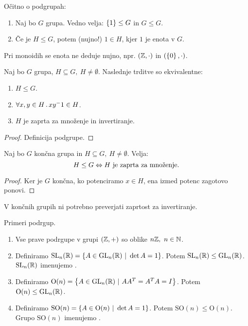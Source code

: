 \begin{opomba} 
    Očitno o podgrupah:
    \begin{enumerate}
        \item Naj bo $G$ grupa. Vedno velja: $\left\{1\right\} \leq G$ in $G \leq G$.
        \item Če je $H \leq G$, potem (nujno!) $1 \in H$, kjer $1$ je enota v $G$.
    \end{enumerate}
\end{opomba}

\begin{opomba}
    Pri monoidih se enota ne deduje nujno, npr. $(\mathbb{Z}, \cdot)$ in $(\left\{0\right\}, \cdot)$.
\end{opomba}

\begin{trditev}
    Naj bo $G$ grupa, $H \subseteq G, \ H \neq \emptyset$. Naslednje trditve so ekvivalentne:
    \begin{enumerate}
        \item $H \leq G$.
        \item $\forall x,y \in H \,.\, xy^-1 \in H$.
        \item $H$ je zaprta za množenje in invertiranje.
    \end{enumerate}
\end{trditev}

\begin{proof}
    Definicija podgrupe.
\end{proof}

\begin{posledica}
    Naj bo $G$ končna grupa in $H \subseteq G, \ H \neq \emptyset$. Velja: 
    $$H \leq G \Leftrightarrow H \text{ je zaprta za množenje}.$$
\end{posledica}

\begin{proof}
    Ker je $G$ končna, ko potenciramo $x \in H$, ena izmed potenc zagotovo ponovi.
\end{proof}

\begin{opomba}
    V končnih grupih ni potrebno preverjati zaprtost za invertiranje.
\end{opomba}

\begin{primer}
    Primeri podrgup.
    \begin{enumerate}
        \item Vse prave podrgupe v grupi $(\mathbb{Z}, +)$ so oblike $n\mathbb{Z}, \ n \in \mathbb{N}$.
        \item Definiramo $\operatorname{SL}_n(\mathbb{R}) = \left\{A \in \operatorname{GL}_n(\mathbb{R}) \ | \ \det A = 1\right\}$. Potem $\operatorname{SL}_n(\mathbb{R}) \leq \operatorname{GL}_n(\mathbb{R})$. $\operatorname{SL}_n(\mathbb{R})$ imenujemo .
        \item Definiramo $\text{O}(n) = \left\{A \in \operatorname{GL}_n(\mathbb{R}) \ | \ AA^T = A^TA = I\right\}$. Potem $\text{O}(n) \leq \operatorname{GL}_n(\mathbb{R})$.
        \item Definiramo $\text{SO}(n) = \left\{A \in \text{O}(n) \ | \ \det A = 1\right\}$. Potem $\text{SO}(n) \leq \text{O}(n)$. Grupo $\text{SO}(n)$ imenujemo .
    \end{enumerate}
\end{primer}

